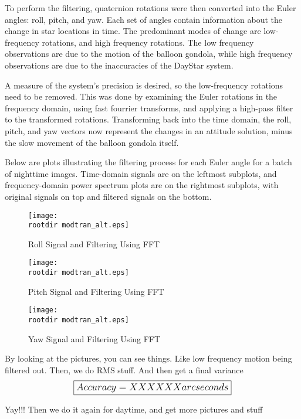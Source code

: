 \documentclass[twocolumn,letterpaper]{IEEEAerospace2012}
\newcommand{\rootdir}{./Figures/}
\begin{document}
To perform the filtering, quaternion rotations were then converted into the Euler angles: roll, pitch, and yaw. Each set of angles contain information about the change in star locations in time. The predominant modes of change are low-frequency rotations, and high frequency rotations. The low frequency observations are due to the motion of the balloon gondola, while high frequency observations are due to the inaccuracies of the DayStar system.

A measure of the system's precision is desired, so the low-frequency rotations need to be removed. This was done by examining the Euler rotations in the frequency domain, using fast fourrier transforms, and applying a high-pass filter to the transformed rotations. Transforming back into the time domain, the roll, pitch, and yaw vectors now represent the changes in an attitude solution, minus the slow movement of the balloon gondola itself.

Below are plots illustrating the filtering process for each Euler angle for a batch of nighttime images. Time-domain signals are on the leftmost subplots, and frequency-domain power spectrum plots are on the rightmost subplots, with original signals on top and filtered signals on the bottom.


\begin{figure}
    \texttt{[image: \\rootdir modtran\_alt.eps]}
    \caption{Roll Signal and Filtering Using FFT}
    \label{fig:Roll Filtering}
\end{figure}

\begin{figure}
    \texttt{[image: \\rootdir modtran\_alt.eps]}
    \caption{Pitch Signal and Filtering Using FFT}
    \label{fig:Pitch Filtering}
\end{figure}

\begin{figure}
    \texttt{[image: \\rootdir modtran\_alt.eps]}
    \caption{Yaw Signal and Filtering Using FFT}
    \label{fig:Yaw Filtering}
\end{figure}

By looking at the pictures, you can see things. Like low frequency motion being filtered out. Then, we do RMS stuff. And then get a final variance
\begin{displaymath}\large
    \boxed{Accuracy = XXXXXX arcseconds}
\end{displaymath}

Yay!!! Then we do it again for daytime, and get more pictures and stuff
\end{document}
